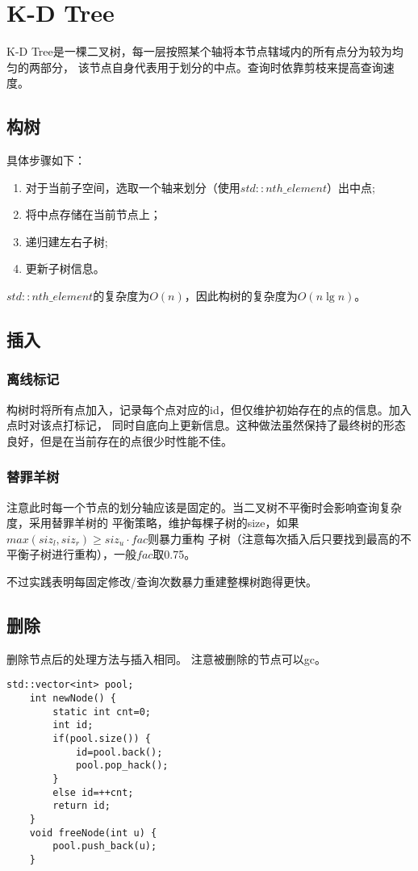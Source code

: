 \section{K-D Tree}
K-D Tree是一棵二叉树，每一层按照某个轴将本节点辖域内的所有点分为较为均匀的两部分，
该节点自身代表用于划分的中点。查询时依靠剪枝来提高查询速度。
\subsection{构树}
具体步骤如下：
\begin{enumerate}
	\item 对于当前子空间，选取一个轴来划分（使用$std::nth\_element$）出中点;
	\item 将中点存储在当前节点上；
	\item 递归建左右子树;
	\item 更新子树信息。
\end{enumerate}
$std::nth\_element$的复杂度为$O(n)$，因此构树的复杂度为$O(n\lg n)$。
\subsection{插入}
\subsubsection{离线标记}
构树时将所有点加入，记录每个点对应的id，但仅维护初始存在的点的信息。加入点时对该点打标记，
同时自底向上更新信息。这种做法虽然保持了最终树的形态良好，但是在当前存在的点很少时性能不佳。
\subsubsection{替罪羊树}
注意此时每一个节点的划分轴应该是固定的。当二叉树不平衡时会影响查询复杂度，采用替罪羊树的
平衡策略，维护每棵子树的size，如果$max(siz_l,siz_r)\geq siz_u \cdot fac$则暴力重构
子树（注意每次插入后只要找到最高的不平衡子树进行重构），一般$fac$取0.75。

不过实践表明每固定修改/查询次数暴力重建整棵树跑得更快。
\subsection{删除}
删除节点后的处理方法与插入相同。
注意被删除的节点可以gc。

\begin{lstlisting}[title=gc]
    std::vector<int> pool;
    int newNode() {
        static int cnt=0;
        int id;
        if(pool.size()) {
            id=pool.back();
            pool.pop_hack();
        }
        else id=++cnt;
        return id;
    }
    void freeNode(int u) {
        pool.push_back(u);
    }
\end{lstlisting}

